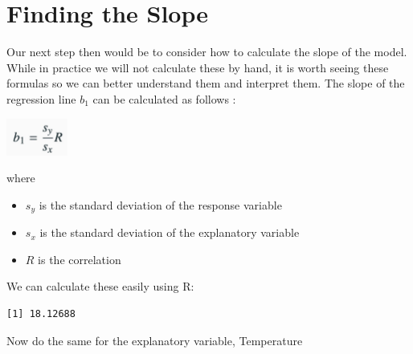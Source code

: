 \documentclass[
  letterpaper,
  DIV=11,
  numbers=noendperiod]{scrreprt}
\newenvironment{Shaded}{\begin{snugshade}}{\end{snugshade}}
\newcommand{\CommentTok}[1]{\textcolor[rgb]{0.37,0.37,0.37}{#1}}
\newcommand{\FunctionTok}[1]{\textcolor[rgb]{0.28,0.35,0.67}{#1}}
\newcommand{\NormalTok}[1]{\textcolor[rgb]{0.00,0.23,0.31}{#1}}
\newcommand{\OtherTok}[1]{\textcolor[rgb]{0.00,0.23,0.31}{#1}}
\newcommand{\SpecialCharTok}[1]{\textcolor[rgb]{0.37,0.37,0.37}{#1}}
\providecommand{\tightlist}{%
  \setlength{\itemsep}{0pt}\setlength{\parskip}{0pt}}\usepackage{longtable,booktabs,array}
\begin{document}
\section*{Finding the Slope}\label{finding-the-slope}


Our next step then would be to consider how to calculate the slope of
the model. While in practice we will not calculate these by hand, it is
worth seeing these formulas so we can better understand them and
interpret them. The slope of the regression line \(b_1\) can be
calculated as follows :

\includegraphics[width=0.15\textwidth,height=\textheight]{./images/LMR_4.jpg}

where

\begin{itemize}
\tightlist
\item
  \(s_y\) is the standard deviation of the response variable
\item
  \(s_x\) is the standard deviation of the explanatory variable
\item
  \(R\) is the correlation
\end{itemize}

We can calculate these easily using R:

\begin{Shaded}
\end{Shaded}

\begin{verbatim}
[1] 18.12688
\end{verbatim}

Now do the same for the explanatory variable, Temperature

\begin{Shaded}
\end{Shaded}
\end{document}
